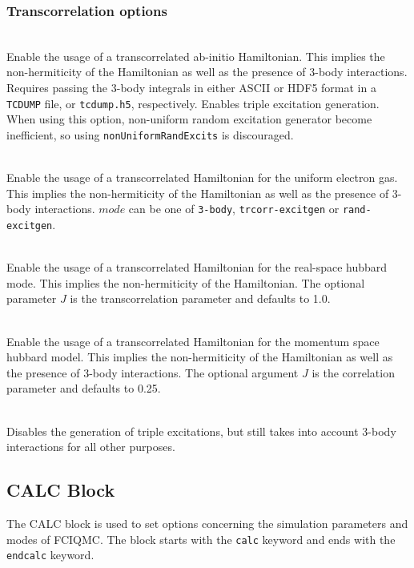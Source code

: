 \documentclass[a4paper,notitlepage,dvipsnames]{scrreprt}
\newcommand\codeitem[1]{\needspace{1.5\baselineskip}\item[\textnormal{\ttfamily #1 \nopagebreak}] \hfill \\ \nopagebreak}
\begin{document}
  \subsubsection{Transcorrelation options}
  \begin{description}
    \codeitem{molecular-transcorr}
    Enable the usage of a transcorrelated ab-initio Hamiltonian. This implies the
    non-hermiticity of the Hamiltonian as well as the presence of 3-body
    interactions. Requires passing the 3-body integrals in either ASCII or
    HDF5 format in a \texttt{TCDUMP} file, or \texttt{tcdump.h5},
    respectively. Enables triple excitation generation. When using this
    option, non-uniform random excitation generator become inefficient, so
    using \texttt{nonUniformRandExcits} is discouraged.
    \codeitem{ueg-transcorr $mode$}
    Enable the usage of a transcorrelated Hamiltonian for the uniform electron
    gas. This implies the non-hermiticity of the Hamiltonian as well as the
    presence of 3-body interactions. $mode$ can be one of \texttt{3-body},
    \texttt{trcorr-excitgen} or \texttt{rand-excitgen}.
    \codeitem{transcorr [$J$]}
    Enable the usage of a transcorrelated Hamiltonian for the real-space
    hubbard mode. This implies the non-hermiticity of the Hamiltonian. The
    optional parameter $J$ is the transcorrelation parameter and defaults to 1.0.
    \codeitem{2-body-transcorr [$J$]}
    Enable the usage of a transcorrelated Hamiltonian for the momentum space
    hubbard model. This implies the non-hermiticity of the Hamiltonian as well as the
    presence of 3-body interactions. The optional argument $J$ is the
    correlation parameter and defaults to 0.25.
    \codeitem{exclude-3-body-ex}
    Disables the generation of triple excitations, but still takes into
    account 3-body interactions for all other purposes.
  \end{description}

  \subsection{CALC Block}
  The CALC block is used to set options concerning the simulation parameters
  and modes of FCIQMC. The block starts with the \texttt{calc} keyword and
  ends with the \texttt{endcalc} keyword.
\end{document}
